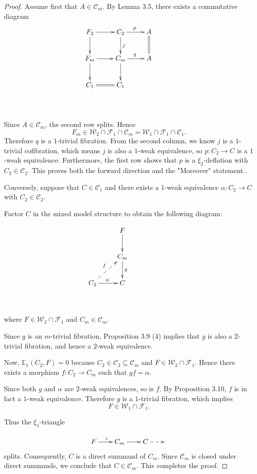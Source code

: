\documentclass[11pt,a4paper]{amsart}
\numberwithin{equation}{section}
\theoremstyle{plain}
\begin{document}
\begin{proof}
	Assume first that \(A\in\mathcal{C}_m\). By Lemma 3.5, there exists a commutative diagram
	\[
	\xymatrix{
		F_2 \ar[r] \ar[d]
		& C_2 \ar[r]^{p} \ar[d]^{j}
		& A \ar@{=}[d]
		&
		\\
		F_m \ar[r] \ar[d]
		& C_m \ar[r]^{q} \ar[d]
		& A 
		& 
		\\
		C_1 \ar@{=}[r] 
		& C_1 
		&
		&
		\\
		{}
		& 
		&
		&
	}
	\]
	
	Since \(A\in\mathcal{C}_m\), the second row splits. Hence
	\[
	F_m\in
	\mathcal{W}_2\cap\mathcal{F}_1\cap\mathcal{C}_m
	=
	\mathcal{W}_1\cap\mathcal{F}_1\cap\mathcal{C}_1.
	\]
	Therefore \(q\) is a $1$-trivial fibration. From the second column, we know $j$ is a $1$-trivial cofibration, which means $j$ is also a $1$-weak equivalence, so $p: C_2 \to C$ is a $1$-weak equivalence. Furthermore, the first row shows that $p$ is a $\xi_2$-deflation with $C_2 \in \mathcal{C}_2$. This proves both the forward direction and the "Moreover" statement..
	
Conversely, suppose that \(C\in\mathcal{C}_1\) and there exists a $1$-weak equivalence
\(
\alpha:C_2\to C
\)
with
\(
C_2\in\mathcal{C}_2.
\)

Factor \(C\) in the mixed model structure to obtain the following diagram:

\[
\xymatrix{
	& F \ar[d]
	&
	&
	\\
	& C_m \ar[d]^{g}
	&
	&
	\\
	C_2 \ar[r]^{\alpha} \ar@{-->}[ur]^{f}
	& C
	&
	&
	\\
	& 
	&
	&
}
\]
where
\(
F\in\mathcal{W}_2\cap\mathcal{F}_1
\)
and
\(
C_m\in\mathcal{C}_m.
\)

Since \(g\) is an $m$-trivial fibration, Proposition 3.9 (4) implies that \(g\) is also a $2$-trivial fibration, and hence a $2$-weak equivalence.

Now,
\(
\mathbb{E}_{1}(C_2,F)=0
\)
because
\(
C_2\in\mathcal{C}_2\subseteq\mathcal{C}_m
\)
and
\(
F\in\mathcal{W}_2\cap\mathcal{F}_1.
\)
Hence there exists a morphism
\(
f:C_2\to C_m
\)
such that
\(
gf=\alpha.
\)

Since both \(g\) and \(\alpha\) are $2$-weak equivalences, so is \(f\). By Proposition 3.10, \(f\) is in fact a $1$-weak equivalence. Therefore \(g\) is a $1$-trivial fibration, which implies
\[
F\in\mathcal{W}_1\cap\mathcal{F}_1.
\]

Thus the $\xi_1$-triangle

	\[
\xymatrix@C=2em{
	F \ar[r]^i &
	C_m \ar[r] &
	C\ar@{-->}[r] &
	{}
}
\]
splits. Consequently, \(C\) is a direct summand of \(C_m\). Since \(\mathcal{C}_m\) is closed under direct summands, we conclude that
\(
C\in\mathcal{C}_m.
\)
This completes the proof.
	

\end{proof}
\end{document}
